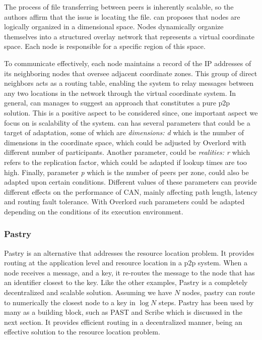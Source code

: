 The process of file transferring between peers is inherently scalable, so the authors affirm that the issue is locating the file. \gls{can} proposes that nodes are logically organized in a dimensional space. Nodes dynamically organize themselves into a structured overlay network that represents a virtual coordinate space. Each node is responsible for a specific region of this space.

To communicate effectively, each node maintains a record of the IP addresses of its neighboring nodes that oversee adjacent coordinate zones. This group of direct neighbors acts as a routing table, enabling the system to relay messages between any two locations in the network through the virtual coordinate system.
In general, \gls{can} manages to suggest an approach that constitutes a pure \gls{p2p} solution. This is a positive aspect to be considered since, one important aspect we focus on is scalability of the system. \gls{can} has several parameters that could be a target of adaptation, some of which are \textit{dimensions: d} which is the number of dimensions in the coordinate space, which could be adjusted by Overlord with different number of participants. Another parameter, could be \textit{realities: r} which refers to the replication factor, which could be adapted if lookup times are too high. Finally, parameter \textit{p} which is the number of peers per zone, could also be adapted upon certain conditions. Different values of these parameters can provide different effects on the performance of CAN, mainly affecting path length, latency and routing fault tolerance. With Overlord such parameters could be adapted depending on the conditions of its execution environment.

\subsubsection{Pastry}
\label{sssec:pastry}

Pastry \cite{Rowstron2001} is an alternative that addresses the resource location problem. It provides routing at the application level and resource location in a \gls{p2p} system. When a node receives a message, and a key, it re-routes the message to the node that has an identifier closest to the key. Like the other examples, Pastry is a completely decentralized and scalable solution. Assuming we have $N$ nodes, pastry can route to numerically the closest node to a key in $\log N$ steps. Pastry has been used by many as a building block, such as PAST \cite{Druschel2001} and Scribe\cite{Rowstron2001a} which is discussed in the next section. It provides efficient routing in a decentralized manner, being an effective solution to the resource location problem.

